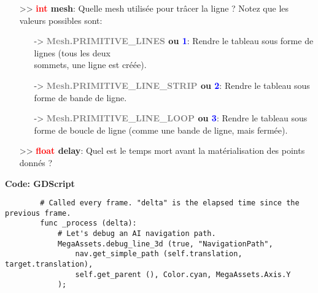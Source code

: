 \documentclass[a4paper, 11pt]{article}
\begin{document}
\begin{description}
\begin{itemize}
			\item[>> \textbf{\textcolor{red}{int} mesh}:] Quelle mesh utilisée pour trâcer la ligne ? Notez
			que les valeurs possibles sont:
			\begin{itemize}
				\item [-> \textbf{\textcolor{gray}{Mesh.PRIMITIVE\_LINES} ou \textcolor{blue}{1}}:] Rendre 
				le tableau sous forme de lignes (tous les deux \\sommets, une ligne est créée).
				\item [-> \textbf{\textcolor{gray}{Mesh.PRIMITIVE\_LINE\_STRIP} ou \textcolor{blue}{2}}:] 
				Rendre le tableau sous forme de bande de ligne.
				\item [-> \textbf{\textcolor{gray}{Mesh.PRIMITIVE\_LINE\_LOOP} ou \textcolor{blue}{3}}:] 
				Rendre le tableau sous forme de boucle de ligne (comme une bande de ligne, mais fermée).
			\end{itemize}
			\item[>> \textbf{\textcolor{red}{float} delay}:] Quel est le temps mort avant la matérialisation 
			des points donnés ?\\
		\end{itemize}
	\end{description}
	\textbf{Code: GDScript}
	\begin{lstlisting}
		# Called every frame. "delta" is the elapsed time since the previous frame.
		func _process (delta):
			# Let's debug an AI navigation path.
			MegaAssets.debug_line_3d (true, "NavigationPath",
				nav.get_simple_path (self.translation, target.translation),
				self.get_parent (), Color.cyan, MegaAssets.Axis.Y
			);
	\end{lstlisting}
\end{document}
